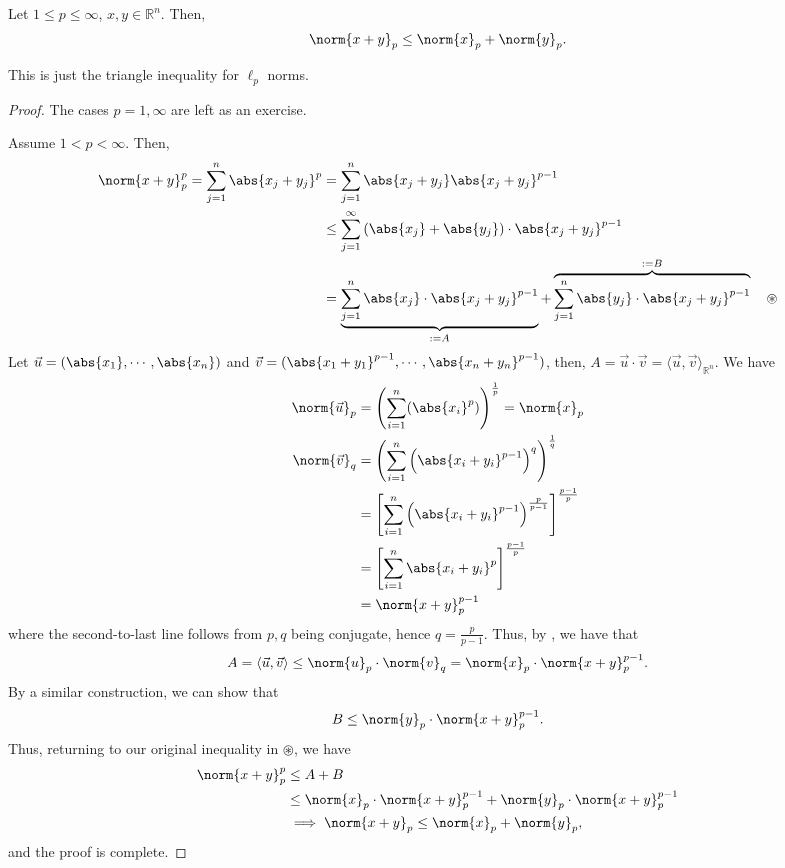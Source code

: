 \begin{proposition}\label{pro:Minkowski}
    Let $1 \leq p \leq \infty$, $x, y \in \mathbb{R}^n$. Then, \[
    \norm{x+ y}_p \leq \norm{x}_p + \norm{y}_p.    
    \]
\end{proposition}
\begin{remark}
    This is just the triangle inequality for $\ell_p$ norms.
\end{remark}

\begin{proof}
    The cases $p = 1, \infty$ are left as an exercise. %

    Assume $1 < p < \infty$. Then, \begin{align*}
        \norm{x +y}_p^p = \sum_{j=1}^n \abs{x_j + y_j}^p &= \sum_{j=1}^{n} \abs{x_j + y_j}\abs{x_j + y_j}^{p-1}\\
        &\leq \sum_{j=1}^{\infty} \left(\abs{x_j} + \abs{y_j}\right)\cdot \abs{x_j + y_j}^{p-1} \\
        &= \underbrace{\sum_{j=1}^n \abs{x_j}\cdot \abs{x_j + y_j}^{p-1}}_{:=A} + \overbrace{\sum_{j=1}^n \abs{y_j} \cdot \abs{x_j + y_j}^{p-1}}^{:=B} \quad \circledast
    \end{align*}
    Let $\vec{u} = (\abs{x_1}, \cdots, \abs{x_n})$ and $\vec{v} = (\abs{x_1+y_1}^{p-1}, \cdots, \abs{x_n + y_n}^{{p-1}})$, then, $A = \vec{u} \cdot \vec{v} = \langle \vec{u}, \vec{v}\rangle_{\mathbb{R}^n}$. We have \begin{align*}
        \norm{\vec{u}}_p &= \left(\sum_{i=1}^n (\abs{x_i}^p)\right)^{\frac{1}{p}} = \norm{x}_p\\
        \norm{\vec{v}}_q &= \left(\sum_{i=1}^{n}\left(\abs{x_i + y_i}^{p-1}\right)^q\right)^{\frac{1}{q}}\\
        &= \left[\sum_{i=1}^n \left(\abs{x_i + y_i}^{p-1}\right)^{\frac{p}{p-1}}\right]^{\frac{p-1}{p}}\\
        &= \left[\sum_{i=1}^n \abs{x_i + y_i}^{p}\right]^{\frac{p-1}{p}}\\
        &= \norm{x+y}_p^{p-1}
    \end{align*}
    where the second-to-last line follows from $p, q$ being conjugate, hence $q = \frac{p}{p-1}$. Thus, by , we have that \[
    A = \langle \vec{u}, \vec{v}\rangle \leq \norm{u}_p \cdot \norm{v}_q = \norm{x}_p \cdot \norm{x+y}^{p-1}_p.    
    \]
    By a similar construction, we can show that \[
    B \leq \norm{y}_p \cdot \norm{x+y}^{p-1}_p.   
    \]
    Thus, returning to our original inequality in $\circledast$, we have \begin{align*}
        \norm{x+y}^{p}_p &\leq A + B \\
        &\leq \norm{x}_p\cdot \norm{x+y}^{p-1}_p + \norm{y}_p \cdot \norm{x+y}_p^{p-1}\\
        &\implies \norm{x+y}_p \leq \norm{x}_p + \norm{y}_p,
    \end{align*}
    and the proof is complete.
\end{proof}